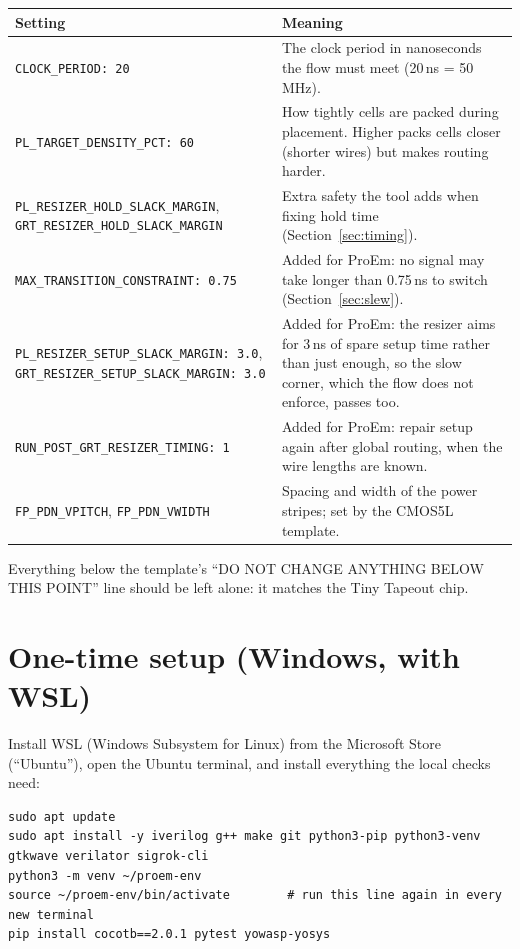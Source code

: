 \documentclass[11pt,a4paper]{article}
\begin{document}
\begin{center}
\begin{tabularx}{\linewidth}{@{}>{\raggedright\arraybackslash}p{6.2cm}L@{}}
\toprule
Setting & Meaning \\
\midrule
\texttt{CLOCK\_PERIOD: 20} & The clock period in nanoseconds the flow must meet (20\,ns = 50\,MHz). \\
\texttt{PL\_TARGET\_DENSITY\_PCT: 60} & How tightly cells are packed during placement. Higher packs cells closer (shorter wires) but makes routing harder. \\
\texttt{PL\_RESIZER\_HOLD\_SLACK\_MARGIN}, \texttt{GRT\_RESIZER\_HOLD\_SLACK\_MARGIN} & Extra safety the tool adds when fixing hold time (Section~\ref{sec:timing}). \\
\texttt{MAX\_TRANSITION\_CONSTRAINT: 0.75} & Added for ProEm: no signal may take longer than 0.75\,ns to switch (Section~\ref{sec:slew}). \\
\texttt{PL\_RESIZER\_SETUP\_SLACK\_MARGIN: 3.0}, \texttt{GRT\_RESIZER\_SETUP\_SLACK\_MARGIN: 3.0} & Added for ProEm: the resizer aims for 3\,ns of spare setup time rather than just enough, so the slow corner, which the flow does not enforce, passes too. \\
\texttt{RUN\_POST\_GRT\_RESIZER\_TIMING: 1} & Added for ProEm: repair setup again after global routing, when the wire lengths are known. \\
\texttt{FP\_PDN\_VPITCH}, \texttt{FP\_PDN\_VWIDTH} & Spacing and width of the power stripes; set by the CMOS5L template. \\
\bottomrule
\end{tabularx}
\end{center}

Everything below the template's ``DO NOT CHANGE ANYTHING BELOW THIS POINT'' line should be left alone: it matches the Tiny Tapeout chip.

\section{One-time setup (Windows, with WSL)}\label{sec:setup}

Install WSL (Windows Subsystem for Linux) from the Microsoft Store (``Ubuntu''), open the Ubuntu terminal, and install everything the local checks need:

\begin{lstlisting}
sudo apt update
sudo apt install -y iverilog g++ make git python3-pip python3-venv gtkwave verilator sigrok-cli
python3 -m venv ~/proem-env
source ~/proem-env/bin/activate        # run this line again in every new terminal
pip install cocotb==2.0.1 pytest yowasp-yosys
\end{lstlisting}
\end{document}
